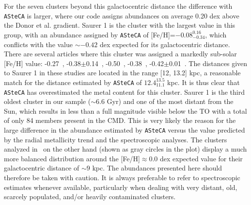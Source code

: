 \documentclass{aa}
\begin{document}
  For the seven clusters beyond this galactocentric distance the
  difference with \texttt{ASteCA} is larger, where our code assigns abundances
  on average 0.20 dex above the Donor et al. gradient.
  Saurer 1 is the cluster with the largest value in this group, with
  an abundance assigned by \texttt{ASteCA} of [Fe/H]=$-0.08_{-0.34}^{0.16}$,
  which conflicts with the value $\sim-0.42$ dex expected for its
  galactocentric distance.
  There are several articles where this cluster was assigned a 
  markedly sub-solar [Fe/H] value: -0.27~\citep{Carraro_2003},
  -0.38$\pm$0.14~\citep{Carraro_2004},
  -0.50~\citep{Frinchaboy_2004}, -0.38~\citep{Frinchaboy_2006},
  -0.42$\pm$0.01~\citep{Donor_2020}. The distances given to Saurer 1 in these
  studies are located in the range [12, 13.2] kpc, a reasonable match
  for the distance estimated by \texttt{ASteCA} of $12.4_{11.1}^{13.5}$ kpc. It
  is thus clear that \texttt{ASteCA} has overestimated the metal
  content for this cluster. Saurer 1 is the third oldest cluster in our sample 
  ($\sim6.6$ Gyr) and one of the most distant from the Sun, which results in
  less than a  full magnitude visible below the TO with a total of only 84
  members present in the CMD. This is very likely the reason
  for the large difference in the abundance estimated by \texttt{ASteCA}
  versus the value predicted by the radial metallicity trend and the
  spectroscopic analyses.
  The clusters analyzed in~\cite{Perren_2020} on the other hand (shown as gray
  circles in the plot) display a much more balanced distribution around the 
  [Fe/H]$\approx0.0$ dex expected value for their galactocentric distance of
  $\sim9$ kpc.
  The abundances presented here should therefore be taken with
  caution. It is always preferable to refer to spectroscopic estimates
  whenever available, particularly when dealing with very distant, old,
  scarcely populated, and/or heavily contaminated clusters.\\
\end{document}
